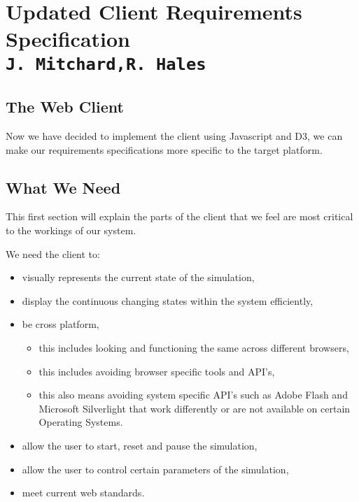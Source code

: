 \pagestyle{empty}

\section{Updated Client Requirements Specification\\{\small\tt{J.~Mitchard,R.~Hales}}}

\subsection{The Web Client}
Now we have decided to implement the client using Javascript and D3, we can make our requirements specifications more specific to the target platform.

\subsection{What We Need}
This first section will explain the parts of the client that we feel are most critical to the workings of our system. 

We need the client to:
\begin{itemize}
	\item visually represents the current state of the simulation,
	\item display the continuous changing states within the system efficiently,
	\item be cross platform,
	\begin{itemize}
		\item this includes looking and functioning the same across different browsers,
		\item this includes avoiding browser specific tools and API's,
		\item this also means avoiding system specific API's such as Adobe Flash and Microsoft Silverlight that work differently or are not available on certain Operating Systems.
	\end{itemize}
	\item allow the user to start, reset and pause the simulation,
	\item allow the user to control certain parameters of the simulation,
	\item meet current web standards.
\end{itemize}

